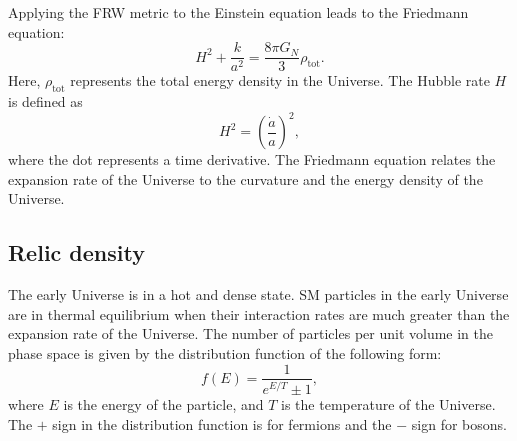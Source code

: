 \documentclass[doublespace,nopageskip]{VTthesis}
\begin{document}
Applying the FRW metric to the Einstein equation leads to the Friedmann equation:
\begin{equation}
    H^2 + \frac{k}{a^2} = \frac{8\pi G_N}{3}\rho_\mathrm{tot}.
\end{equation}
Here, $\rho_\mathrm{tot}$ represents the total energy density in the Universe. The Hubble rate $H$ is defined as
\begin{equation}
    H^2 = \left(\frac{\dot{a}}{{a}}\right)^2,
\end{equation}
where the dot represents a time derivative. The Friedmann equation relates the expansion rate of the Universe to the curvature and the energy density of the Universe.

\subsection{{Relic density}}

The early Universe is in a hot and dense state. SM particles in the early Universe are in thermal equilibrium when their interaction rates are much greater than the expansion rate of the Universe. The number of particles per unit volume in the phase space is given by the distribution function of the following form:
\begin{equation}
    f(E) = \frac{1}{e^{E/T}\pm 1},
\end{equation}
where $E$ is the energy of the particle, and $T$ is the temperature of the Universe. The $+$ sign in the distribution function is for fermions and the $-$ sign for bosons.
\end{document}
